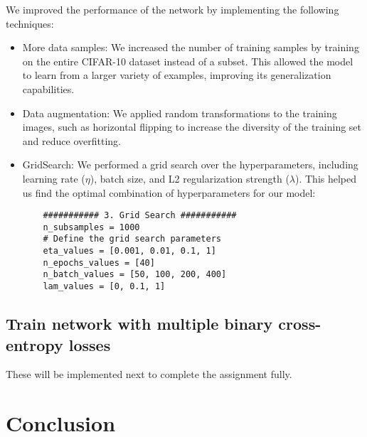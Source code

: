 \documentclass{article}
\begin{document}
We improved the performance of the network by implementing the following techniques:
\begin{itemize}
    \item More data samples: We increased the number of training samples by training on the entire CIFAR-10 dataset instead of a subset. This allowed the model to learn from a larger variety of examples, improving its generalization capabilities.
    \item Data augmentation: We applied random transformations to the training images, such as horizontal flipping to increase the diversity of the training set and reduce overfitting.
    \item GridSearch: We performed a grid search over the hyperparameters, including learning rate ($\eta$), batch size, and L2 regularization strength ($\lambda$). This helped us find the optimal combination of hyperparameters for our model:
    \begin{verbatim}
    ########### 3. Grid Search ###########
    n_subsamples = 1000
    # Define the grid search parameters
    eta_values = [0.001, 0.01, 0.1, 1]
    n_epochs_values = [40]
    n_batch_values = [50, 100, 200, 400]
    lam_values = [0, 0.1, 1]
    \end{verbatim}
\end{itemize}


\subsection{Train network with multiple binary cross-entropy losses}

These will be implemented next to complete the assignment fully.

\section{Conclusion}
\end{document}
